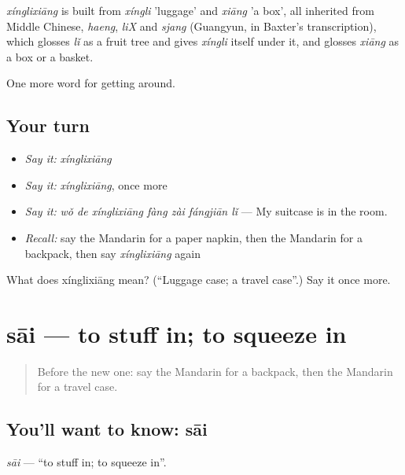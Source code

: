 \begin{cousinweb}
\emph{xínglixiāng} is built from \emph{xíngli} 'luggage' and \emph{xiāng} 'a box', all inherited from Middle Chinese, \emph{haeng}, \emph{liX} and \emph{sjang} (Guangyun, in Baxter's transcription), which glosses \emph{lǐ} as a fruit tree and gives \emph{xíngli} itself under it, and glosses \emph{xiāng} as a box or a basket.
\end{cousinweb}

\begin{grammarlens}[title={What you've built}]
One more word for getting around.
\end{grammarlens}

\subsection*{Your turn}
\begin{itemize}
\raggedright
  \item \emph{Say it:} \emph{xínglixiāng}
  \item \emph{Say it:} \emph{xínglixiāng}, once more
  \item \emph{Say it:} \emph{wǒ de xínglixiāng fàng zài fángjiān lǐ} — My suitcase is in the room.
  \item \emph{Recall:} say the Mandarin for a paper napkin, then the Mandarin for a backpack, then say \emph{xínglixiāng} again
\end{itemize}

\begin{tcolorbox}[breakable,colback=teal!4,colframe=teal!35!black,title={Before you move on}]
What does xínglixiāng mean? (\textquotedblleft{}Luggage case; a travel case\textquotedblright{}.) Say it once more.
\end{tcolorbox}
\section[sāi]{sāi — to stuff in; to squeeze in}

\label{lesson:ZH-C453-sai}



\begin{quote}
Before the new one: say the Mandarin for a backpack, then the Mandarin for a travel case.
\end{quote}

\subsection*{You'll want to know: sāi}
\emph{sāi} — \textquotedblleft{}to stuff in; to squeeze in\textquotedblright{}.

